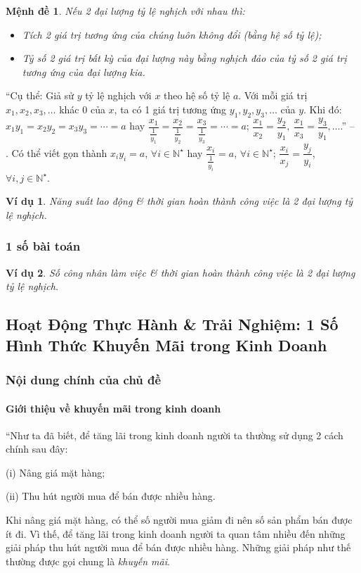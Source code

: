 \documentclass{article}
\numberwithin{equation}{section}
\newtheorem{vidu}{Ví dụ}[section]
\newtheorem{menhde}{Mệnh đề}[section]
\begin{document}
\begin{menhde}
	Nếu 2 đại lượng tỷ lệ nghịch với nhau thì:
	\begin{itemize}
		\item Tích 2 giá trị tương ứng của chúng luôn không đổi (bằng hệ số tỷ lệ);
		\item Tỷ số 2 giá trị bất kỳ của đại lượng này bằng nghịch đảo của tỷ số 2 giá trị tương ứng của đại lượng kia.
	\end{itemize}
\end{menhde}
``Cụ thể: Giả sử $y$ tỷ lệ nghịch với $x$ theo hệ số tỷ lệ $a$. Với mỗi giá trị $x_1,x_2,x_3,\ldots$ khác $0$ của $x$, ta có 1 giá trị tương ứng $y_1,y_2,y_3,\ldots$ của $y$. Khi đó: $x_1y_1 = x_2y_2 = x_3y_3 = \cdots = a$ hay $\dfrac{x_1}{\frac{1}{y_1}} = \dfrac{x_2}{\frac{1}{y_2}} = \dfrac{x_3}{\frac{1}{y_3}} = \cdots = a$; $\dfrac{x_1}{x_2} = \dfrac{y_2}{y_1},\ \dfrac{x_1}{x_3} = \dfrac{y_3}{y_1},\ldots$.'' -- \cite[p. 66]{SGK_Toan_7_Canh_Dieu_tap_1}. Có thể viết gọn thành $x_iy_i = a$, $\forall i\in\mathbb{N}^\star$ hay $\dfrac{x_i}{\frac{1}{y_i}} = a$, $\forall i\in\mathbb{N}^\star$; $\dfrac{x_i}{x_j} = \dfrac{y_j}{y_i}$, $\forall i,j\in\mathbb{N}^\star$.

\begin{vidu}
	Năng suất lao động \& thời gian hoàn thành công việc là 2 đại lượng tỷ lệ nghịch.
\end{vidu}

\subsubsection{1 số bài toán}

\begin{vidu}
	Số công nhân làm việc \& thời gian hoàn thành công việc là 2 đại lượng tỷ lệ nghịch.
\end{vidu}

\subsection{Hoạt Động Thực Hành \& Trải Nghiệm: 1 Số Hình Thức Khuyến Mãi trong Kinh Doanh}

\subsubsection{Nội dung chính của chủ đề}

\paragraph{Giới thiệu về khuyến mãi trong kinh doanh}
``Như ta đã biết, để tăng lãi trong kinh doanh người ta thường sử dụng 2 cách chính sau đây:
\begin{enumerate*}
	\item[(i)] Nâng giá mặt hàng;
	\item[(ii)] Thu hút người mua để bán được nhiều hàng.
\end{enumerate*}
Khi nâng giá mặt hàng, có thể số người mua giảm đi nên số sản phẩm bán được ít đi. Vì thế, để tăng lãi trong kinh doanh người ta quan tâm nhiều đến những giải pháp thu hút người mua để bán được nhiều hàng. Những giải pháp như thế thường được gọi chung là \textit{khuyến mãi}.
\end{document}

